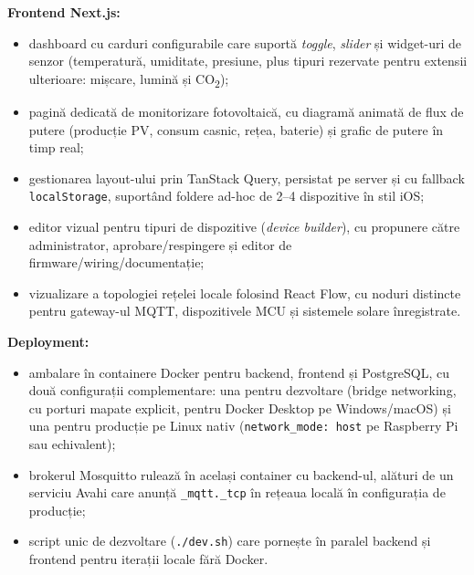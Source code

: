 \textbf{Frontend Next.js:}
\begin{itemize}
    \item dashboard cu carduri configurabile care suportă \textit{toggle}, \textit{slider} și widget-uri de senzor (temperatură, umiditate, presiune, plus tipuri rezervate pentru extensii ulterioare: mișcare, lumină și CO\textsubscript{2});
    \item pagină dedicată de monitorizare fotovoltaică, cu diagramă animată de flux de putere (producție PV, consum casnic, rețea, baterie) și grafic de putere în timp real;
    \item gestionarea layout-ului prin TanStack Query, persistat pe server și cu fallback \texttt{localStorage}, suportând foldere ad-hoc de 2--4 dispozitive în stil iOS;
    \item editor vizual pentru tipuri de dispozitive (\textit{device builder}), cu propunere către administrator, aprobare/respingere și editor de firmware/wiring/documentație;
    \item vizualizare a topologiei rețelei locale folosind React Flow, cu noduri distincte pentru gateway-ul MQTT, dispozitivele MCU și sistemele solare înregistrate.
\end{itemize}

\textbf{Deployment:}
\begin{itemize}
    \item ambalare în containere Docker pentru backend, frontend și PostgreSQL, cu două configurații complementare: una pentru dezvoltare (bridge networking, cu porturi mapate explicit, pentru Docker Desktop pe Windows/macOS) și una pentru producție pe Linux nativ (\texttt{network\_mode: host} pe Raspberry Pi sau echivalent);
    \item brokerul Mosquitto rulează în același container cu backend-ul, alături de un serviciu Avahi care anunță \texttt{\_mqtt.\_tcp} în rețeaua locală în configurația de producție;
    \item script unic de dezvoltare (\texttt{./dev.sh}) care pornește în paralel backend și frontend pentru iterații locale fără Docker.
\end{itemize}


